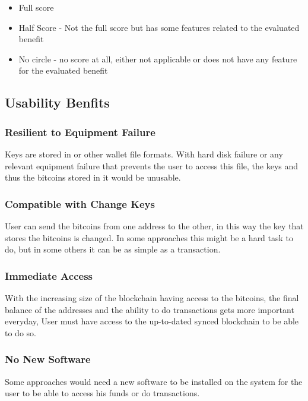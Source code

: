 \begin{itemize}
\renewcommand{\labelitemi}{$\bullet$}
\item Full score
\renewcommand{\labelitemi}{$\circ$}
\item Half Score - Not the full score but has some features related to the evaluated benefit
\renewcommand{\labelitemi}{$\textvisiblespace$}
\item No circle - no score at all, either not applicable or does not have any feature for the evaluated benefit
\end{itemize}



\subsection{Usability Benfits}

\subsubsection{Resilient to Equipment Failure}
\label{Resilient to Equipment Failure}
Keys are stored in \walletfile or other wallet file formats. With hard disk failure or any relevant equipment failure that prevents the user to access this file, the keys and thus the bitcoins stored in it would be unusable.

\subsubsection{Compatible with Change Keys}
\label{Compatible with Change Keys}
User can send the bitcoins from one address to the other, in this way the key that stores the bitcoins is changed. In some approaches this might be a hard task to do, but in some others it can be as simple as a transaction.

\subsubsection{Immediate Access}
\label{Immediate Access}
With the increasing size of the blockchain having access to the bitcoins, the final balance of the addresses and the ability to do transactions gets more important everyday, User must have access to the up-to-dated synced blockchain to be able to do so.

\subsubsection{No New Software} 
\label{No New Software}
Some approaches would need a new software to be installed on the system for the user to be able to access his funds or do transactions.

